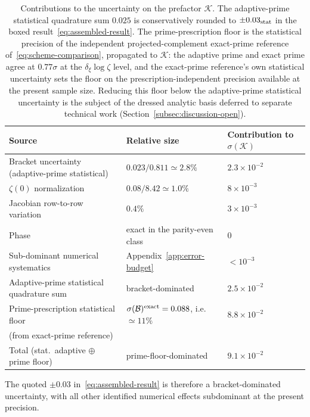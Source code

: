 \documentclass[a4paper,11pt]{article}
\theoremstyle{definition}
\newcommand{\Bobs}{\mathcal{B}}
\begin{document}
\begin{table}[h]
\centering
\begin{tabular}{lll}
\toprule
Source & Relative size & Contribution to $\sigma(\mathcal{K})$ \\
\midrule
Bracket uncertainty (adaptive-prime statistical)
  & $0.023 / 0.811 \simeq 2.8\%$
  & $2.3 \times 10^{-2}$ \\
$\zeta(0)$ normalization
  & $0.08 / 8.42 \simeq 1.0\%$
  & $8 \times 10^{-3}$ \\
Jacobian row-to-row variation
  & $0.4\%$
  & $3 \times 10^{-3}$ \\
Phase
  & exact in the parity-even class
  & $0$ \\
Sub-dominant numerical systematics
  & Appendix~\ref{app:error-budget}
  & $< 10^{-3}$ \\
\midrule
Adaptive-prime statistical quadrature sum
  & bracket-dominated
  & $2.5 \times 10^{-2}$ \\
Prime-prescription statistical floor
  & $\sigma(\Bobs)^{\rm exact} = 0.088$, i.e.\ $\simeq 11\%$
  & $8.8 \times 10^{-2}$ \\
  (from exact-prime reference)
  &
  & \\
\midrule
Total (stat.\ adaptive $\oplus$ prime floor)
  & prime-floor-dominated
  & $9.1 \times 10^{-2}$ \\
\bottomrule
\end{tabular}
\caption{Contributions to the uncertainty on the prefactor
$\mathcal{K}$. The adaptive-prime statistical quadrature sum $0.025$ is conservatively rounded to $\pm 0.03_{\rm stat}$ in the boxed result~\eqref{eq:assembled-result}. The prime-prescription floor is the statistical precision of the independent projected-complement exact-prime reference of~\eqref{eq:scheme-comparison}, propagated to $\mathcal{K}$: the adaptive prime and exact prime agree at $0.77\sigma$ at the $\delta_\xi\log\zeta$ level, and the exact-prime reference's own statistical uncertainty sets the floor on the prescription-independent precision available at the present sample size. Reducing this floor below the adaptive-prime statistical uncertainty is the subject of the dressed analytic basis deferred to separate technical work (Section~\ref{subsec:discussion-open}).}
\label{tab:error-budget}
\end{table}

The quoted $\pm 0.03$ in~\eqref{eq:assembled-result} is therefore a
bracket-dominated uncertainty, with all other identified numerical
effects subdominant at the present precision.
\end{document}
